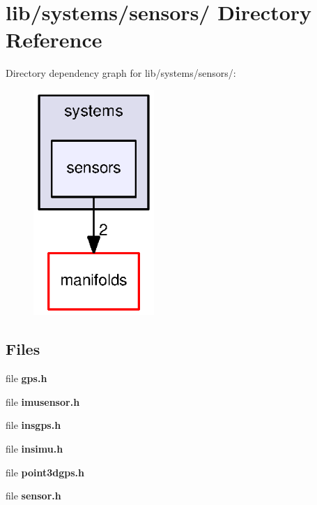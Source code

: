 \section{lib/systems/sensors/ \-Directory \-Reference}
\label{dir_08a164b35eb94898c15c8836174b9b0f}
\-Directory dependency graph for lib/systems/sensors/\-:
\nopagebreak
\begin{figure}[H]
\begin{center}
\leavevmode
\includegraphics[width=130pt]{dir_08a164b35eb94898c15c8836174b9b0f_dep}
\end{center}
\end{figure}
\subsection*{\-Files}
\begin{DoxyCompactItemize}
\item 
file {\bf gps.\-h}
\item 
file {\bf imusensor.\-h}
\item 
file {\bf insgps.\-h}
\item 
file {\bf insimu.\-h}
\item 
file {\bf point3dgps.\-h}
\item 
file {\bf sensor.\-h}
\end{DoxyCompactItemize}

